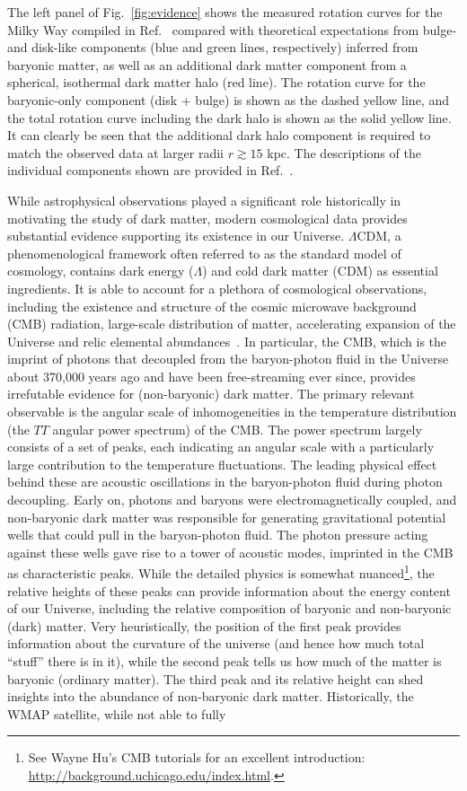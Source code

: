 The left panel of Fig.~\ref{fig:evidence} shows the measured rotation curves for the Milky Way compiled in Ref.~\cite{2009PASJ...61..227S} compared with theoretical expectations from bulge- and disk-like components (blue and green lines, respectively) inferred from baryonic matter, as well as an additional dark matter component from a spherical, isothermal dark matter halo (red line). The rotation curve for the baryonic-only component (disk + bulge) is shown as the dashed yellow line, and the total rotation curve including the dark halo is shown as the solid yellow line. It can clearly be seen that the additional dark halo component is required to match the observed data at larger radii $r \gtrsim 15$ kpc. The descriptions of the individual components shown are provided in Ref.~\cite{2009PASJ...61..227S}.

While astrophysical observations played a significant role historically in motivating the study of dark matter, modern cosmological data provides substantial evidence supporting its existence in our Universe. $\Lambda$CDM, a phenomenological framework often referred to as the standard model of cosmology, contains dark energy ($\Lambda$) and cold dark matter (CDM) as essential ingredients. It is able to account for a plethora of cosmological observations, including the existence and structure of the cosmic microwave background (CMB) radiation, large-scale distribution of matter, accelerating expansion of the Universe and relic elemental abundances~\cite{Dodelson:1282338,Kolb:1990vq}. In particular, the CMB, which is the imprint of photons that decoupled from the baryon-photon fluid in the Universe about 370,000 years ago and have been free-streaming ever since, provides irrefutable evidence for (non-baryonic) dark matter. The primary relevant observable is the angular scale of inhomogeneities in the temperature distribution (the $TT$ angular power spectrum) of the CMB. The power spectrum largely consists of a set of peaks, each indicating an angular scale with a particularly large contribution to the temperature fluctuations. The leading physical effect behind these are acoustic oscillations in the baryon-photon fluid during photon decoupling. Early on, photons and baryons were electromagnetically coupled, and non-baryonic dark matter was responsible for generating gravitational potential wells that could pull in the baryon-photon fluid. The photon pressure acting against these wells gave rise to a tower of acoustic modes, imprinted in the CMB as characteristic peaks. While the detailed physics is somewhat nuanced\footnote{See Wayne Hu's CMB tutorials for an excellent introduction: \url{http://background.uchicago.edu/index.html}.}, the relative heights of these peaks can provide information about the energy content of our Universe, including the relative composition of baryonic and non-baryonic (dark) matter. Very heuristically, the position of the first peak provides information about the curvature of the universe (and hence how much total ``stuff'' there is in it), while the second peak tells us how much of the matter is baryonic (ordinary matter). The third peak and its relative height can shed insights into the abundance of non-baryonic dark matter. Historically, the WMAP satellite, while not able to fully 
